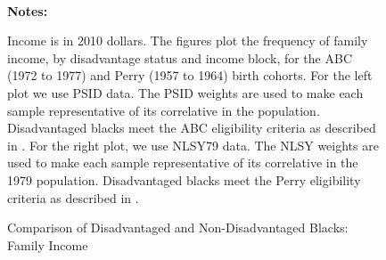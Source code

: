 \begin{figure} \begin{center}\centering
        \caption{Comparison of Disadvantaged and Non-Disadvantaged Blacks: Family Income}
        \label{graph:abc_moink_b}\vspace{0.2cm}
          \\
\end{center}
{\scriptsize {\bfseries Notes: } \raggedright 
Income is in 2010 dollars. The figures plot the frequency of family income, by disadvantage status and income block, for the ABC (1972 to 1977) and Perry (1957 to 1964) birth cohorts.  For the left plot we use PSID data. The PSID weights are used to make each sample representative  of its correlative in the population. Disadvantaged blacks meet the  ABC eligibility criteria as described in \citet{Ramey_Smith_1977_AJMD}. For the right plot, we use NLSY79 data. The NLSY weights are used to make each sample representative  of its correlative in the 1979 population. Disadvantaged blacks meet the Perry eligibility criteria as described in \citet{heckman2010analyzing}.
}
\end{figure}

